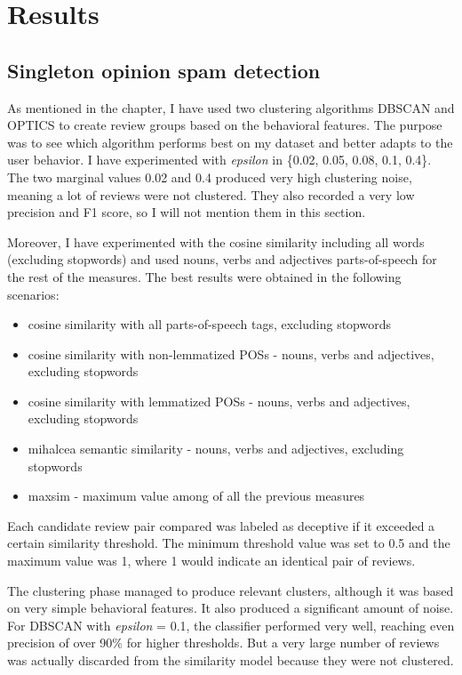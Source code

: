 \chapter{Results}
\label{chapter:Results}
\section{Singleton opinion spam detection}



As mentioned in the  chapter, I have used two clustering algorithms DBSCAN and OPTICS to create review groups based on the behavioral features. The purpose was to see which algorithm performs best on my dataset and better adapts to the user behavior. 
I have experimented with \textit{epsilon} in \{0.02, 0.05, 0.08, 0.1, 0.4\}. The two marginal values 0.02 and 0.4 produced very high clustering noise, meaning a lot of reviews were not clustered. They also recorded a very low precision and F1 score, so I will not mention them in this section.

Moreover, I have experimented with the cosine similarity including all words (excluding stopwords) and used nouns, verbs and adjectives parts-of-speech for the rest of the measures. The best results were obtained in the following scenarios:
\begin{itemize}
\item cosine similarity with all parts-of-speech tags, excluding stopwords
\item cosine similarity with non-lemmatized POSs - nouns, verbs and adjectives, excluding stopwords
\item cosine similarity with lemmatized POSs - nouns, verbs and adjectives, excluding stopwords
\item mihalcea semantic similarity - nouns, verbs and adjectives, excluding stopwords
\item maxsim - maximum value among of all the previous measures
\end{itemize}
Each candidate review pair compared was labeled as deceptive if it exceeded a certain similarity threshold. The minimum threshold value was set to 0.5 and the maximum value was 1, where 1 would indicate an identical pair of reviews.

The clustering phase managed to produce relevant clusters, although it was based on very simple behavioral features. It also produced a significant amount of noise. For DBSCAN with \textit{epsilon} = 0.1, the classifier performed very well, reaching even precision of over 90\% for higher thresholds. But a very large number of reviews was actually discarded from the similarity model because they were not clustered.

